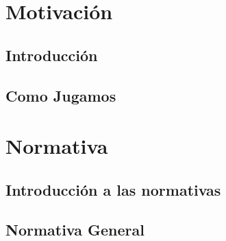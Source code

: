 \documentclass[11pt,fleqn]{book} %
\begin{document}



\pagestyle{empty} %
\tableofcontents %

\cleardoublepage %

\pagestyle{fancy} %


\part{Motivación}


\chapter{Introducción}


\chapter{Como Jugamos}


\part{Normativa}

\chapter{Introducción a las normativas}

\chapter{Normativa General}
\end{document}
